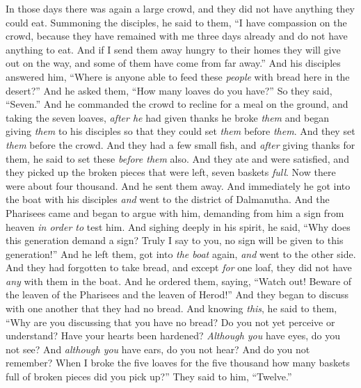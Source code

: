 \begin{biblechapter} %
 In those days there was again a large crowd, and they did not have anything they could eat. Summoning the disciples, he said to them,
\verse “I have compassion on the crowd, because they have remained with me three days already and do not have anything to eat.
\verse And if I send them away hungry to their homes they will give out on the way, and some of them have come from far away.”
\verse And his disciples answered him, “Where is anyone able to feed these \textit{people} with bread here in the desert?”
\verse And he asked them, “How many loaves do you have?” So they said, “Seven.”
\verse And he commanded the crowd to recline for a meal on the ground, and taking the seven loaves, \textit{after he} had given thanks he broke \textit{them} and began giving \textit{them} to his disciples so that they could set \textit{them} before \textit{them}. And they set \textit{them} before the crowd.
\verse And they had a few small fish, and \textit{after} giving thanks for them, he said to set these \textit{before them} also.
\verse And they ate and were satisfied, and they picked up the broken pieces that were left, seven baskets \textit{full}.
\verse Now there were about four thousand. And he sent them away.
\verse And immediately he got into the boat with his disciples \textit{and} went to the district of Dalmanutha.
 And the Pharisees came and began to argue with him, demanding from him a sign from heaven \textit{in order to} test him.
\verse And sighing deeply in his spirit, he said, “Why does this generation demand a sign? Truly I say to you, no sign will be given to this generation!”
\verse And he left them, got into \textit{the boat} again, \textit{and} went to the other side.
 And they had forgotten to take bread, and except \textit{for} one loaf, they did not have \textit{any} with them in the boat.
\verse And he ordered them, saying, “Watch out! Beware of the leaven of the Pharisees and the leaven of Herod!”
\verse And they began to discuss with one another that they had no bread.
\verse And knowing \textit{this}, he said to them, “Why are you discussing that you have no bread? Do you not yet perceive or understand? Have your hearts been hardened?
\verse \textit{Although you} have eyes, do you not see? And \textit{although you} have ears, do you not hear? And do you not remember?
\verse When I broke the five loaves for the five thousand how many baskets full of broken pieces did you pick up?” They said to him, “Twelve.”

\end{biblechapter}
